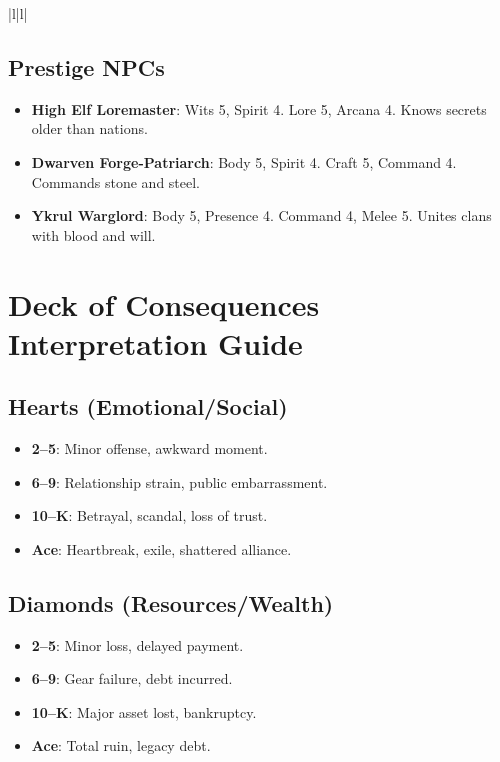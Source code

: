 \begin{itemular}{|l|l|}
\subsection*{Prestige NPCs}

\begin{itemize}
    \item \textbf{High Elf Loremaster}: Wits 5, Spirit 4. Lore 5, Arcana 4. Knows secrets older than nations.
    \item \textbf{Dwarven Forge-Patriarch}: Body 5, Spirit 4. Craft 5, Command 4. Commands stone and steel.
    \item \textbf{Ykrul Warglord}: Body 5, Presence 4. Command 4, Melee 5. Unites clans with blood and will.
\end{itemize}

\section*{Deck of Consequences Interpretation Guide}

\subsection*{Hearts (Emotional/Social)}

\begin{itemize}
    \item \textbf{2–5}: Minor offense, awkward moment.
    \item \textbf{6–9}: Relationship strain, public embarrassment.
    \item \textbf{10–K}: Betrayal, scandal, loss of trust.
    \item \textbf{Ace}: Heartbreak, exile, shattered alliance.
\end{itemize}

\subsection*{Diamonds (Resources/Wealth)}

\begin{itemize}
    \item \textbf{2–5}: Minor loss, delayed payment.
    \item \textbf{6–9}: Gear failure, debt incurred.
    \item \textbf{10–K}: Major asset lost, bankruptcy.
    \item \textbf{Ace}: Total ruin, legacy debt.
\end{itemize}


\end{itemular}

